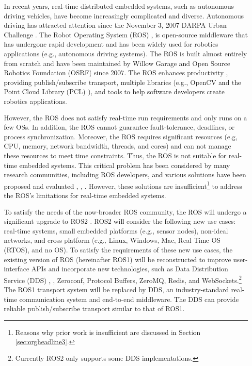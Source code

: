 \documentclass{sig-alternate-05-2015}
\begin{document}
In recent years, real-time distributed embedded systems, such as autonomous driving vehicles, have become increasingly complicated and diverse.
Autonomous driving has attracted attention since the November 3, 2007 DARPA Urban Challenge \cite{urmson2008autonomous}.
The Robot Operating System (ROS) \cite{quigley2009ros}, \cite{rosorg} is open-source middleware that has undergone rapid development \cite{cousins2011exponential} and has been widely used for robotics applications (e.g., autonomous driving systems).
The ROS is built almost entirely from scratch and have been maintained by Willow Garage \cite{willowgarage} and Open Source Robotics Foundation (OSRF) \cite{osrf} since 2007. 
The ROS enhances productivity \cite{cousins2010sharing}, providing publish/subscribe transport, multiple libraries (e.g., OpenCV \cite{opencv} and the Point Cloud Library (PCL) \cite{pcl}), and tools to help software developers create robotics applications.

However, the ROS does not satisfy real-time run requirements and only runs on a few OSs. 
In addition, the ROS cannot guarantee fault-tolerance, deadlines, or process synchronization.
Moreover, the ROS requires significant resources (e.g, CPU, memory, network bandwidth, threads, and cores) and can not manage these resources to meet time constraints.
Thus, the ROS is not suitable for real-time embedded systems. 
This critical problem has been considered by many research communities, including ROS developers, and various solutions have been proposed and evaluated \cite{rosc@roscon2013}, \cite{uros@roscon2013}, \cite{wei2015rt}.
However, these solutions are insufficient\footnote{Reasons why prior work is insufficient are discussed in Section \ref{sec:orgheadline3}.}  to address the ROS's limitations for real-time embedded systems. 

To satisfy the needs of the now-broader ROS community, the ROS will undergo a significant upgrade to ROS2 \cite{ros2_iccps2016}. 
ROS2 will consider the following new use cases: real-time systems, small embedded platforms (e.g., sensor nodes), non-ideal networks, and cross-platform (e.g., Linux, Windows, Mac, Real-Time OS (RTOS), and no OS).
To satisfy the requirements of these new use cases, the existing version of ROS (hereinafter ROS1) will be reconstructed to improve user-interface APIs and incorporate new technologies, such as Data Distribution Service (DDS) \cite{pardo2003omg}, \cite{schlesselman2004omg}, Zeroconf, Protocol Buffers, ZeroMQ, Redis, and WebSockets.\footnote{Currently ROS2 only supports some DDS implementations.}
The ROS1 transport system will be replaced by DDS, an industry-standard real-time communication system and end-to-end middleware. 
The DDS can provide reliable publish/subscribe transport similar to that of ROS1.
\end{document}
